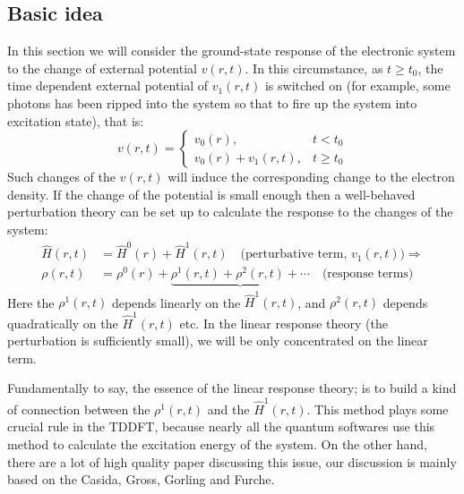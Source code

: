 \subsection{Basic idea}
%
%
In this section we will consider the ground-state response of the
electronic system to the change of external potential $v(r,t)$. In
this circumstance, as $t \geq t_{0}$, the time dependent external
potential of $v_{1}(r,t)$ is switched on (for example, some photons
has been ripped into the system so that to fire up the system into
excitation state), that is:
\begin{equation}\label{TDDFT_basic_ideaeq}
v(r,t)=
 \left\{
  \begin{array}{ll}
    v_{0}(r), & t < t_{0} \\
    v_{0}(r) + v_{1}(r,t), & t \geq t_{0}
  \end{array}
\right.
\end{equation}
Such changes of the $v(r,t)$ will induce the corresponding change to
the electron density. If the change of the potential is small enough
then a well-behaved perturbation theory can be set up to calculate
the response to the changes of the system:
\begin{align}\label{TDDFTeq:15}
\hat{H}(r,t) &= \hat{H}^{0}(r) + \hat{H}^{1}(r,t) \quad
\text{(perturbative term, $v_{1}(r,t)$)} \Rightarrow \nonumber \\
\rho(r,t) &= \rho^{0}(r) + \underbrace{\rho^{1}(r,t) + \rho^{2}(r,t)
+ \cdots} \quad \text{(response terms)}
\end{align}
Here the $\rho^{1}(r,t)$ depends linearly on the $\hat{H}^{1}(r,t)$,
and $\rho^{2}(r,t)$ depends quadratically on the $\hat{H}^{1}(r,t)$
etc. In the linear response theory (the perturbation is sufficiently
small), we will be only concentrated on the linear term.

Fundamentally to say, the essence of the linear response theory; is
to build a kind of connection between the $\rho^{1}(r,t)$ and the
$\hat{H}^{1}(r,t)$. This method plays some crucial rule in the
TDDFT, because nearly all the quantum softwares use this method to
calculate the excitation energy of the system\cite{g03, QCHEM,
turbomole}. On the other hand, there are a lot of high quality paper
discussing this issue, our discussion is mainly based on the
Casida\cite{Casida1}, Gross\cite{PhysRevLett.76.1212, Gross8},
Gorling\cite{gorling:2785} and Furche\cite{furche:5982}.

